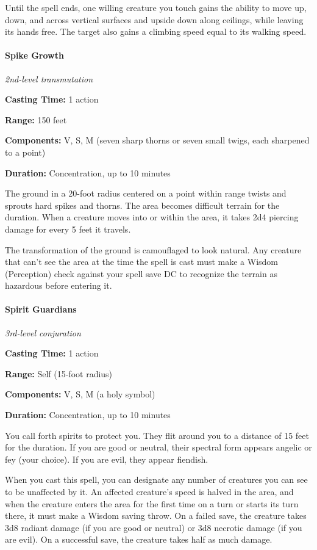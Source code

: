 \documentclass[
]{article}
\begin{document}
Until the spell ends, one willing creature you touch gains the ability
to move up, down, and across vertical surfaces and upside down along
ceilings, while leaving its hands free. The target also gains a climbing
speed equal to its walking speed.

\hypertarget{spike-growth}{%
\paragraph{Spike Growth}\label{spike-growth}}

\emph{2nd-level transmutation}

\textbf{Casting Time:} 1 action

\textbf{Range:} 150 feet

\textbf{Components:} V, S, M (seven sharp thorns or seven small twigs,
each sharpened to a point)

\textbf{Duration:} Concentration, up to 10 minutes

The ground in a 20-foot radius centered on a point within range twists
and sprouts hard spikes and thorns. The area becomes difficult terrain
for the duration. When a creature moves into or within the area, it
takes 2d4 piercing damage for every 5 feet it travels.

The transformation of the ground is camouflaged to look natural. Any
creature that can't see the area at the time the spell is cast must make
a Wisdom (Perception) check against your spell save DC to recognize the
terrain as hazardous before entering it.

\hypertarget{spirit-guardians}{%
\paragraph{Spirit Guardians}\label{spirit-guardians}}

\emph{3rd-level conjuration}

\textbf{Casting Time:} 1 action

\textbf{Range:} Self (15-foot radius)

\textbf{Components:} V, S, M (a holy symbol)

\textbf{Duration:} Concentration, up to 10 minutes

You call forth spirits to protect you. They flit around you to a
distance of 15 feet for the duration. If you are good or neutral, their
spectral form appears angelic or fey (your choice). If you are evil,
they appear fiendish.

When you cast this spell, you can designate any number of creatures you
can see to be unaffected by it. An affected creature's speed is halved
in the area, and when the creature enters the area for the first time on
a turn or starts its turn there, it must make a Wisdom saving throw. On
a failed save, the creature takes 3d8 radiant damage (if you are good or
neutral) or 3d8 necrotic damage (if you are evil). On a successful save,
the creature takes half as much damage.
\end{document}
